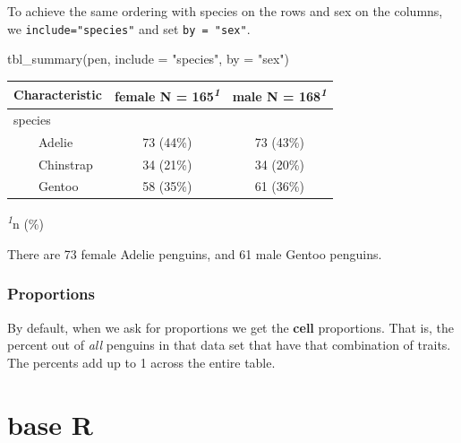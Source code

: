 \documentclass[
  letterpaper,
  DIV=11,
  numbers=noendperiod,
  oneside]{scrreprt}
\newenvironment{Shaded}{\begin{snugshade}}{\end{snugshade}}
\newcommand{\AttributeTok}[1]{\textcolor[rgb]{0.40,0.45,0.13}{#1}}
\newcommand{\FunctionTok}[1]{\textcolor[rgb]{0.28,0.35,0.67}{#1}}
\newcommand{\NormalTok}[1]{\textcolor[rgb]{0.00,0.23,0.31}{#1}}
\newcommand{\SpecialCharTok}[1]{\textcolor[rgb]{0.37,0.37,0.37}{#1}}
\newcommand{\StringTok}[1]{\textcolor[rgb]{0.13,0.47,0.30}{#1}}
\begin{document}
To achieve the same ordering with species on the rows and sex on the
columns, we \texttt{include="species"} and set \texttt{by\ =\ "sex"}.

\begin{Shaded}
\begin{Highlighting}[]
\FunctionTok{tbl\_summary}\NormalTok{(pen, }\AttributeTok{include =} \StringTok{"species"}\NormalTok{, }\AttributeTok{by =} \StringTok{"sex"}\NormalTok{)}
\end{Highlighting}
\end{Shaded}

\begin{table}
\fontsize{12.0pt}{14.4pt}\selectfont
\begin{tabular*}{\linewidth}{@{\extracolsep{\fill}}lcc}
\toprule
\textbf{Characteristic} & \textbf{female}  N = 165\textsuperscript{\textit{1}} & \textbf{male}  N = 168\textsuperscript{\textit{1}} \\ 
\midrule\addlinespace[2.5pt]
species &  &  \\ 
    Adelie & 73 (44\%) & 73 (43\%) \\ 
    Chinstrap & 34 (21\%) & 34 (20\%) \\ 
    Gentoo & 58 (35\%) & 61 (36\%) \\ 
\bottomrule
\end{tabular*}
\begin{minipage}{\linewidth}
\textsuperscript{\textit{1}}n (\%)\\
\end{minipage}
\end{table}

There are 73 female Adelie penguins, and 61 male Gentoo penguins.

\subsubsection{Proportions}\label{proportions}

By default, when we ask for proportions we get the \textbf{cell}
proportions. That is, the percent out of \emph{all} penguins in that
data set that have that combination of traits. The percents add up to 1
across the entire table.

\section{base R}

\begin{Shaded}
\end{Shaded}
\end{document}
